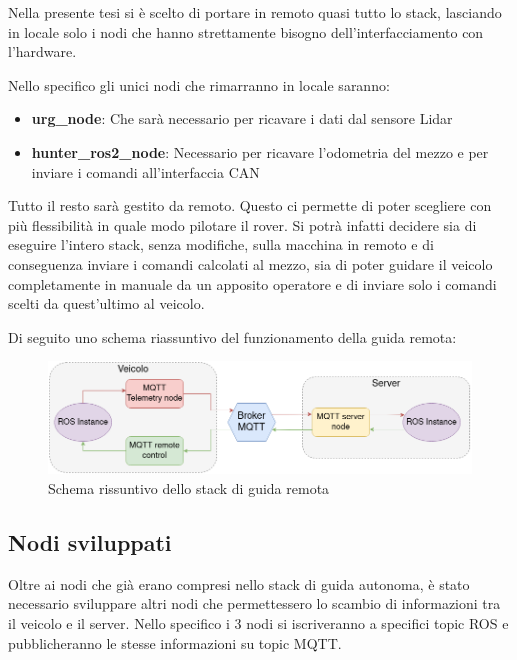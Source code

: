\noindent Nella presente tesi si è scelto di portare in remoto quasi tutto lo stack, lasciando in locale solo i nodi che hanno strettamente bisogno dell'interfacciamento con l'hardware.

\noindent Nello specifico gli unici nodi che rimarranno in locale saranno:

\begin{itemize}
  \item \textbf{urg\_node}: Che sarà necessario per ricavare i dati dal sensore Lidar
  \item \textbf{hunter\_ros2\_node}: Necessario per ricavare l'odometria del mezzo e per inviare i comandi all'interfaccia CAN
\end{itemize}

\noindent Tutto il resto sarà gestito da remoto. Questo ci permette di poter scegliere con più flessibilità in quale modo pilotare il rover. Si potrà infatti decidere sia di eseguire l'intero stack, senza modifiche, sulla macchina in remoto e di conseguenza inviare i comandi calcolati al mezzo, sia di poter guidare il veicolo completamente in manuale da un apposito operatore e di inviare solo i comandi scelti da quest'ultimo al veicolo.

\noindent Di seguito uno schema riassuntivo del funzionamento della guida remota:

\begin{figure}[h]
  \centering
  \includegraphics[width=1\textwidth]{figures/schema_guida_remota.png}
  \caption{Schema rissuntivo dello stack di guida remota}
  \label{Schema rissuntivo dello stack di guida remota}
\end{figure}

\subsection{Nodi sviluppati}
Oltre ai nodi che già erano compresi nello stack di guida autonoma, è stato necessario sviluppare altri nodi che permettessero lo scambio di informazioni tra il veicolo e il server. Nello specifico i 3 nodi si iscriveranno a specifici topic ROS e pubblicheranno le stesse informazioni su topic MQTT.

